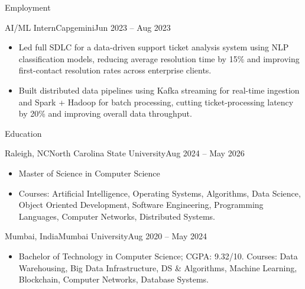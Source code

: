 \documentclass[]{mcdowellcv}
\begin{document}
\begin{cvsection}{Employment}
  \begin{cvsubsection}{AI/ML Intern}{Capgemini}{Jun 2023 -- Aug 2023}
    \begin{itemize}
      \item Led full SDLC for a data-driven support ticket analysis system using NLP classification models, reducing average resolution time by 15\% and improving first-contact resolution rates across enterprise clients.
      \item Built distributed data pipelines using Kafka streaming for real-time ingestion and Spark + Hadoop for batch processing, cutting ticket-processing latency by 20\% and improving overall data throughput.
    \end{itemize}
    \vspace{-1.5pt}
  \end{cvsubsection}
\end{cvsection}

\begin{cvsection}{Education}
  \begin{cvsubsection}{Raleigh, NC}{North Carolina State University}{Aug 2024 -- May 2026}
    \begin{itemize}
      \item Master of Science in Computer Science
      \item Courses: Artificial Intelligence, Operating Systems, Algorithms, Data Science, Object Oriented Development, Software Engineering, Programming Languages, Computer Networks, Distributed Systems.
    \end{itemize}
    \vspace{-1.5pt}
  \end{cvsubsection}

  \begin{cvsubsection}{Mumbai, India}{Mumbai University}{Aug 2020 -- May 2024}
    \begin{itemize}
      \item Bachelor of Technology in Computer Science; CGPA: 9.32/10. Courses: Data Warehousing, Big Data Infrastructure, DS \& Algorithms, Machine Learning, Blockchain, Computer Networks, Database Systems.
    \end{itemize}
    \vspace{-1.5pt}
  \end{cvsubsection}
\end{cvsection}
\end{document}
